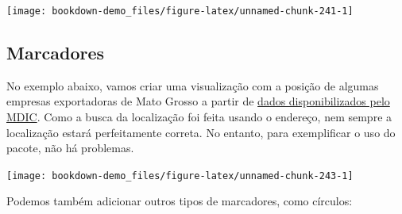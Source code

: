 \documentclass[]{book}
\newenvironment{Shaded}{\begin{snugshade}}{\end{snugshade}}
\newcommand{\KeywordTok}[1]{\textcolor[rgb]{0.13,0.29,0.53}{\textbf{#1}}}
\newcommand{\DataTypeTok}[1]{\textcolor[rgb]{0.13,0.29,0.53}{#1}}
\newcommand{\FloatTok}[1]{\textcolor[rgb]{0.00,0.00,0.81}{#1}}
\newcommand{\StringTok}[1]{\textcolor[rgb]{0.31,0.60,0.02}{#1}}
\newcommand{\OperatorTok}[1]{\textcolor[rgb]{0.81,0.36,0.00}{\textbf{#1}}}
\newcommand{\NormalTok}[1]{#1}
\begin{document}
\begin{center}\texttt{[image: bookdown-demo\_files/figure-latex/unnamed-chunk-241-1]} \end{center}

\subsection{Marcadores}\label{marcadores}

No exemplo abaixo, vamos criar uma visualização com a posição de algumas
empresas exportadoras de Mato Grosso a partir de
\href{http://www.mdic.gov.br/comercio-exterior/estatisticas-de-comercio-exterior/empresas-brasileiras-exportadoras-e-importadoras}{dados
disponibilizados pelo MDIC}. Como a busca da localização foi feita
usando o endereço, nem sempre a localização estará perfeitamente
correta. No entanto, para exemplificar o uso do pacote, não há
problemas.

\begin{Shaded}
\end{Shaded}

\begin{center}\texttt{[image: bookdown-demo\_files/figure-latex/unnamed-chunk-243-1]} \end{center}

Podemos também adicionar outros tipos de marcadores, como círculos:

\begin{Shaded}
\end{Shaded}
\end{document}
